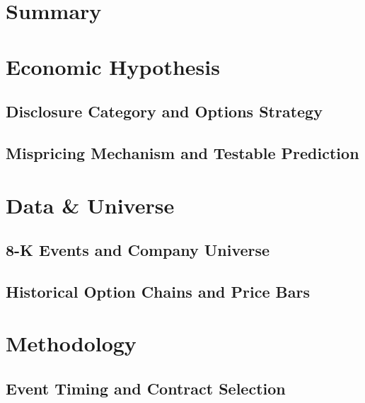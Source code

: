 \documentclass[11pt,letterpaper]{article}
\begin{document}

\section{Summary}

\section{Economic Hypothesis}
\subsection{Disclosure Category and Options Strategy}
\subsection{Mispricing Mechanism and Testable Prediction}

\section{Data \& Universe}
\subsection{8-K Events and Company Universe}
\subsection{Historical Option Chains and Price Bars}

\section{Methodology}
\subsection{Event Timing and Contract Selection}
\end{document}
